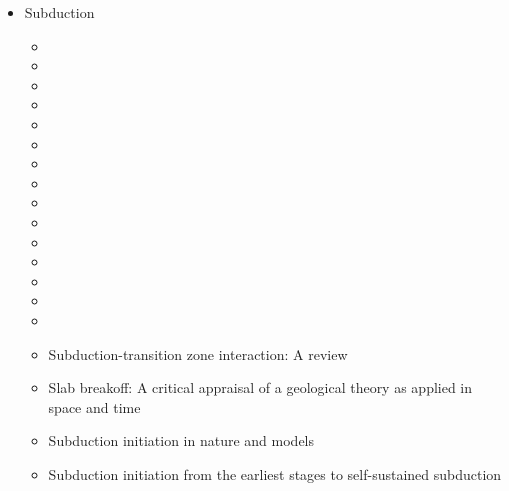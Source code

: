 

\begin{itemize}

\item Subduction
   \begin{itemize}
   \item [\nineteeneightytwo] 
   \item [\nineteenninetyfive] 
   \item [\twothousandone] 
   \item [\twothousandone] 
   \item [\twothousandtwo] 
   \item [\twothousandeight] 
   \item [\twothousandnine] 
   \item [\twothousandnine] 
   \item [\twothousandnine] 
   \item [\twothousandten]  
   \item [\twothousandeleven] 
   \item [\twothousandthirteen] 
   \item [\twothousandfourteen] 
   \item [\twothousandfourteen] 
   \item [\twothousandsixteen] 
   \item [\twothousandseventeen] Subduction-transition zone interaction: A review \cite{goav17}
   \item [\twothousandeighteen] Slab breakoff: A critical appraisal of a geological theory as applied in space and time \cite{garm18}
   \item [\twothousandeighteen] Subduction initiation in nature and models \cite{stge18}
   \item [\twothousandtwentyone] Subduction initiation from the earliest stages to self-sustained subduction \cite{laar21}

\end{itemize}
\end{itemize}
